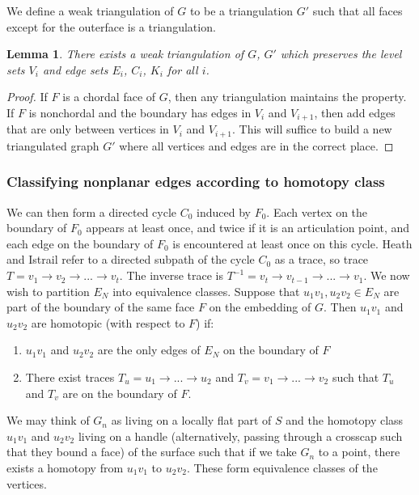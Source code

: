 \documentclass[]{report}
\newtheorem{lemma}[theorem]{Lemma}
\theoremstyle{definition}
\numberwithin{theorem}{section}
\numberwithin{equation}{section}
\begin{document}
We define a weak triangulation of $G$ to be a triangulation $G'$ such that all faces except for the outerface is a triangulation.
\begin{lemma}
	There exists a weak triangulation of $G$, $G'$ which preserves the level sets $V_i$ and edge sets $E_i$, $C_i$, $K_i$ for all $i$. 
\end{lemma}

\begin{proof}
	If $F$ is a chordal face of $G$, then any triangulation maintains the property. If $F$ is nonchordal and the boundary has edges in $V_i$ and $V_{i + 1}$, then add edges that are only between vertices in $V_i$ and $V_{i + 1}$. This will suffice to build a new triangulated graph $G'$ where all vertices and edges are in the correct place. 
\end{proof}

\subsubsection{Classifying nonplanar edges according to homotopy class}

We can then form a directed cycle $C_0$ induced by $F_0$. Each vertex on the boundary of $F_0$ appears at least once, and twice if it is an articulation point, and each edge on the boundary of $F_0$ is encountered at least once on this cycle. Heath and Istrail refer to a directed subpath of the cycle $C_0$ as a trace, so trace $T = v_1 \rightarrow v_2 \rightarrow ... \rightarrow v_t$. The inverse trace is $T^{-1} = v_t \rightarrow v_{t-1} \rightarrow ... \rightarrow v_1$. We now wish to partition $E_N$ into equivalence classes. Suppose that $u_1v_1, u_2v_2 \in E_N$ are part of the boundary of the same face $F$ on the embedding of $G$. Then $u_1v_1$ and $u_2v_2$ are homotopic (with respect to $F$) if:
\begin{enumerate}
	\item $u_1v_1$ and $u_2v_2$ are the only edges of $E_N$ on the boundary of $F$
	\item There exist traces $T_u = u_1 \rightarrow ... \rightarrow u_2$ and $T_v = v_1 \rightarrow ... \rightarrow v_2$ such that $T_u$ and $T_v$ are on the boundary of $F$.
\end{enumerate}
We may think of $G_n$ as living on a locally flat part of $S$ and the homotopy class $u_1v_1$ and $u_2 v_2$ living on a handle (alternatively, passing through a crosscap such that they bound a face) of the surface such that if we take $G_n$ to a point, there exists a homotopy from $u_1v_1$ to $u_2v_2$. These form equivalence classes of the vertices.
\end{document}
